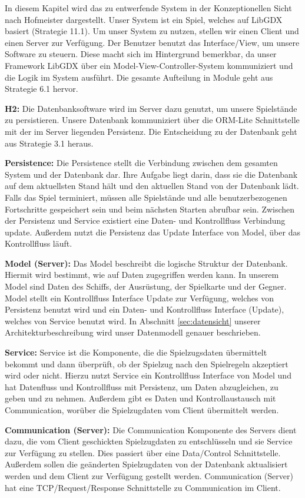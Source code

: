 \documentclass[fontsize=12pt,paper=a4,twoside]{scrartcl}
\begin{document}
In diesem Kapitel wird das zu entwerfende System in der Konzeptionellen Sicht nach Hofmeister dargestellt. Unser System ist ein Spiel, welches auf LibGDX basiert (Strategie 11.1). Um unser System zu nutzen, stellen wir einen Client und einen Server zur Verfügung. Der Benutzer benutzt das Interface/View, um unsere Software zu steuern. Diese macht sich im Hintergrund bemerkbar, da unser Framework LibGDX über ein Model-View-Controller-System kommuniziert und die Logik im System ausführt. Die gesamte Aufteilung in Module geht aus Strategie 6.1 hervor.

\textbf{H2:} 
Die Datenbanksoftware wird im Server dazu genutzt, um unsere Spielstände zu persistieren. Unsere Datenbank kommuniziert über die ORM-Lite Schnittstelle mit der im Server liegenden Persistenz. Die Entscheidung zu der Datenbank geht aus Strategie 3.1 heraus.  

\textbf{Persistence:}
Die Persistence stellt die Verbindung zwischen dem gesamten System und der Datenbank dar. Ihre Aufgabe liegt darin, dass sie die Datenbank auf dem aktuellsten Stand hält und den aktuellen Stand von der Datenbank lädt. Falls das Spiel terminiert, müssen alle Spielstände und alle benutzerbezogenen Fortschritte gespeichert sein und beim nächsten Starten abrufbar sein. Zwischen der Persistenz und Service existiert eine Daten- und Kontrollfluss Verbindung update. Außerdem nutzt die Persistenz das Update Interface von Model, über das Kontrollfluss läuft. 

\textbf{Model (Server):}
Das Model beschreibt die logische Struktur der Datenbank. Hiermit wird bestimmt, wie auf Daten zugegriffen werden kann. 
In unserem Model sind Daten des Schiffs, der Ausrüstung, der Spielkarte und der Gegner. Model stellt ein Kontrollfluss Interface Update zur Verfügung, welches von Persistenz benutzt wird und ein Daten- und Kontrollfluss Interface (Update), welches von Service benutzt wird. In Abschnitt \ref{sec:datensicht} unserer Architekturbeschreibung wird unser Datenmodell genauer beschrieben. 

\textbf{Service:}
Service ist die Komponente, die die Spielzugsdaten übermittelt bekommt und dann überprüft, ob der Spielzug nach den Spielregeln akzeptiert wird oder nicht. Hierzu nutzt Service ein Kontrollfluss Interface von Model und hat Datenfluss und Kontrollfluss mit Persistenz, um Daten abzugleichen, zu geben und zu nehmen. Außerdem gibt es Daten und Kontrollaustausch mit Communication, worüber die Spielzugdaten vom Client übermittelt werden. 

\textbf{Communication (Server):}
Die Communication Komponente des Servers dient dazu, die vom Client geschickten Spielzugdaten zu entschlüsseln und sie Service zur Verfügung zu stellen. Dies passiert über eine Data/Control Schnittstelle. Außerdem sollen die geänderten Spielzugdaten von der Datenbank aktualisiert werden und dem Client zur Verfügung gestellt werden. Communication (Server) hat eine TCP/Request/Response Schnittstelle zu Communication im Client. 
\end{document}
